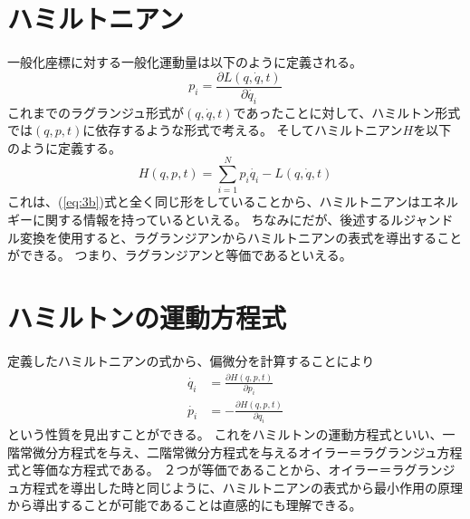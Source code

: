 \documentclass[a4paper]{jsreport}
\begin{document}
        \section{ハミルトニアン}
            一般化座標に対する一般化運動量は以下のように定義される。
            \begin{equation} \label{eq:4a}
                p_i = \frac{\partial L(q, \dot{q}, t)}{\partial \dot{q_i}}
            \end{equation}
            これまでのラグランジュ形式が$(q, \dot{q}, t)$であったことに対して、ハミルトン形式では$(q, p ,t)$に依存するような形式で考える。
            そしてハミルトニアン$H$を以下のように定義する。
            \begin{equation} \label{eq:4b}
                H(q, p ,t) = \sum_{i=1}^N p_i \dot{q_i} - L(q, \dot{q}, t)
            \end{equation}
            これは、(\ref{eq:3b})式と全く同じ形をしていることから、ハミルトニアンはエネルギーに関する情報を持っているといえる。
            ちなみにだが、後述するルジャンドル変換を使用すると、ラグランジアンからハミルトニアンの表式を導出することができる。
            つまり、ラグランジアンと等価であるといえる。

        \section{ハミルトンの運動方程式}
            定義したハミルトニアンの式から、偏微分を計算することにより
            \begin{align}
                \dot{q_i} &= \frac{\partial H(q, p ,t)}{\partial p_i} \label{eq:4c} \\
                \dot{p_i} &= - \frac{\partial H(q, p ,t)}{\partial q_i} \label{eq:4d}
            \end{align}
            という性質を見出すことができる。
            これをハミルトンの運動方程式といい、一階常微分方程式を与え、二階常微分方程式を与えるオイラー＝ラグランジュ方程式と等価な方程式である。
            ２つが等価であることから、オイラー＝ラグランジュ方程式を導出した時と同じように、ハミルトニアンの表式から最小作用の原理から導出することが可能であることは直感的にも理解できる。
\end{document}
